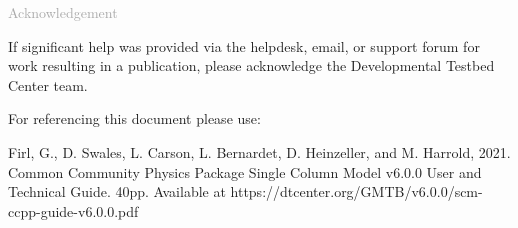 \begin{titlepage}
\vspace*{0.5cm}
\noindent

\begin{flushleft}
\textcolor{darkgray}{\LARGE Acknowledgement}
\vspace*{1cm}\par

If significant help was provided via the helpdesk, email, or support forum for work resulting in a publication, please acknowledge the Developmental Testbed Center team.\\
\vspace*{1cm}\par
For referencing this document please use:\\
\vspace*{1cm}\par
Firl, G., D. Swales, L. Carson, L. Bernardet, D. Heinzeller, and M. Harrold, 2021. Common Community Physics Package Single Column Model v6.0.0 User and Technical Guide. 40pp. Available at https://dtcenter.org/GMTB/v6.0.0/scm-ccpp-guide-v6.0.0.pdf

\end{flushleft}
\end{titlepage}
\pagebreak{}
